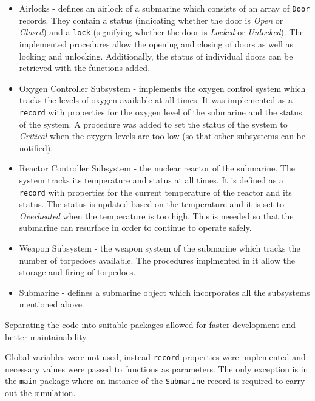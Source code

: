 \documentclass{llncs}
\begin{document}
\begin{itemize}
	\item Airlocks - defines an airlock of a submarine which consists of an array of \texttt{Door} records. They contain a status (indicating whether the door is \textit{Open} or \textit{Closed}) and a \texttt{lock} (signifying whether the door is \textit{Locked} or \textit{Unlocked}). The implemented procedures allow the opening and closing of doors as well as locking and unlocking. Additionally, the status of individual doors can be retrieved with the functions added.
	
	\item Oxygen Controller Subsystem - implements the oxygen control system which tracks the levels of oxygen available at all times. It was implemented as a \texttt{record} with properties for the oxygen level of the submarine and the status of the system. A procedure was added to set the status of the system to \textit{Critical} when the oxygen levels are too low (so that other subsystems can be notified).
	
	\item Reactor Controller Subsystem - the nuclear reactor of the submarine. The system tracks its temperature and status at all times. It is defined as a \texttt{record} with properties for the current temperature of the reactor and its status. The status is updated based on the temperature and it is set to \textit{Overheated} when the temperature is too high. This is neeeded so that the submarine can resurface in order to continue to operate safely.
	
	\item Weapon Subsystem - the weapon system of the submarine which tracks the number of torpedoes available. The procedures implmented in it allow the storage and firing of torpedoes.
	
	\item Submarine - defines a submarine object which incorporates all the subsystems mentioned above. 
\end{itemize}

Separating the code into suitable packages allowed for faster development and better maintainability. 

Global variables were not used, instead \texttt{record} properties were implemented and necessary values were passed to functions as parameters. The only exception is in the \texttt{main} package where an instance of the \texttt{Submarine} record is required to carry out the simulation.
\end{document}
